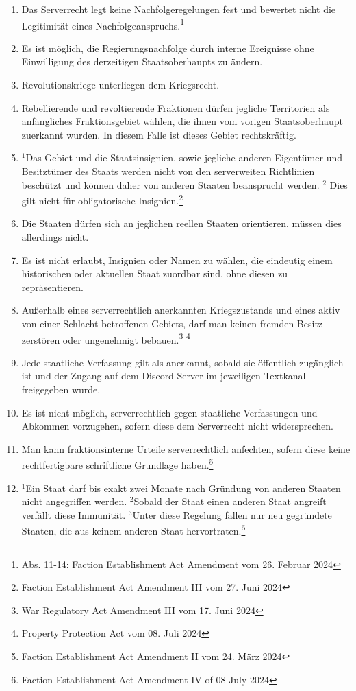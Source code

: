 \documentclass{article}
\begin{document}
\begin{enumerate}[(1)]
	\item Das Serverrecht legt keine Nachfolgeregelungen fest und bewertet nicht die Legitimität eines Nachfolgeanspruchs.\footnote{Abs. 11-14: Faction Establishment Act Amendment vom 26. Februar 2024}
	\item Es ist möglich, die Regierungsnachfolge durch interne Ereignisse ohne Einwilligung des derzeitigen Staatsoberhaupts zu ändern.
	\item Revolutionskriege unterliegen dem Kriegsrecht.
	\item Rebellierende und revoltierende Fraktionen dürfen jegliche Territorien als anfängliches Fraktionsgebiet wählen, die ihnen vom vorigen Staatsoberhaupt zuerkannt wurden. In diesem Falle ist dieses Gebiet rechtskräftig.
    \item ${^1}$Das Gebiet und die Staatsinsignien, sowie jegliche anderen Eigentümer und Besitztümer des Staats werden nicht von den serverweiten Richtlinien beschützt und können daher von anderen Staaten beansprucht werden. ${^2}$ Dies gilt nicht für obligatorische Insignien.\footnote{Faction Establishment Act Amendment III vom 27. Juni 2024}
    \item Die Staaten dürfen sich an jeglichen reellen Staaten orientieren, müssen dies allerdings nicht.
    \item Es ist nicht erlaubt, Insignien oder Namen zu wählen, die eindeutig einem historischen oder aktuellen Staat zuordbar sind, ohne diesen zu repräsentieren.	
    \item Außerhalb eines serverrechtlich anerkannten Kriegszustands und eines aktiv von einer Schlacht betroffenen Gebiets, darf man keinen fremden Besitz zerstören oder ungenehmigt bebauen.\footnote{War Regulatory Act Amendment III vom 17. Juni 2024} \footnote{Property Protection Act vom 08. Juli 2024}  
    \item Jede staatliche Verfassung gilt als anerkannt, sobald sie öffentlich zugänglich ist und der Zugang auf dem Discord-Server im jeweiligen Textkanal freigegeben wurde.
    \item Es ist nicht möglich, serverrechtlich gegen staatliche Verfassungen und Abkommen vorzugehen, sofern diese dem Serverrecht nicht widersprechen.
    \item Man kann fraktionsinterne Urteile serverrechtlich anfechten, sofern diese keine rechtfertigbare schriftliche Grundlage haben.\footnote{Faction Establishment Act Amendment II vom 24. März 2024}
	\item ${^1}$Ein Staat darf bis exakt zwei Monate nach Gründung von anderen Staaten nicht angegriffen werden. ${^2}$Sobald der Staat einen anderen Staat angreift verfällt diese Immunität. ${^3}$Unter diese Regelung fallen nur neu gegründete Staaten, die aus keinem anderen Staat hervortraten.\footnote{Faction Establishment Act Amendment IV of 08 July 2024}
\end{enumerate}
\end{document}
